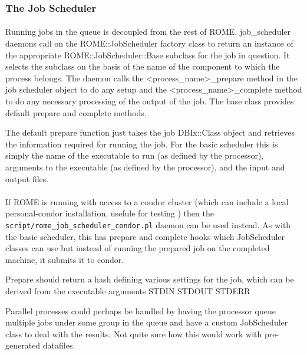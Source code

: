 \subsubsection{The Job Scheduler}
\label{sec:job_scheduling}

\paragraph{}
Running jobs in the queue is decoupled from the rest of ROME. job\_scheduler daemons call on the ROME::JobScheduler factory class to return an instance of the appropriate ROME::JobScheduler::Base subclass for the job in question. It selects the subclass on the basis of the name of the component to which the process belongs. The daemon calls the <process_name>_prepare method in the job scheduler object to do any setup and the <process_name>_complete method to do any necessary processing of the output of the job. The base class provides default prepare and complete methods. 

The default prepare function just takes the job DBIx::Class object and retrieves the information required for running the job. For the basic scheduler this is simply the name of the executable to run (as defined by the processor), arguments to the executable (as defined by the processor), and the input and output files. 


\paragraph{}
If ROME is running with access to a condor cluster (which can include a local personal-condor installation, usefule for testing ) then the \texttt{script/rome\_job\_scheduler\_condor.pl} daemon can be used instead. As with the basic scheduler, this has prepare and complete hooks which JobScheduler classes can use but instead of running the prepared job on the completed machine, it submits it to condor.

Prepare should return a hash defining various settings for the job, which can be derived from the 
executable
arguments
STDIN
STDOUT
STDERR




Parallel processes could perhaps be handled by having the processor queue multiple jobs under some group in the queue and have a custom JobScheduler class to deal with the results. Not quite sure how this would work with pre-generated datafiles.





